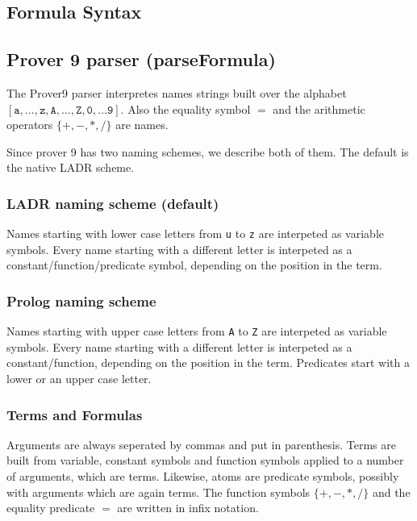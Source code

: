\documentclass[a4paper,11pt]{article}
\begin{document}
\begin{appendix}

\section{Formula Syntax}
\label{app:formulasyntax}
\subsection{Prover 9 parser (parseFormula)}

The Prover9 parser interpretes names strings built over the alphabet
 $[\mathtt{a, \ldots, z, A ,\ldots, Z, 0, \ldots 9} ]$. Also the
 equality symbol $=$ and the arithmetic operators $\{\mathtt{+,-,*,/}\}$
 are names.

Since prover 9 has two naming schemes, we describe both of them. The default
 is the native LADR scheme.

\subsubsection{LADR naming scheme (default)}

Names starting with lower case letters from \texttt{u} to \texttt{z} are
 interpeted as variable symbols. Every name starting with a different letter
 is interpeted as a constant/function/predicate symbol, depending on the
 position in the term.

\subsubsection{Prolog naming scheme}
Names starting with upper case letters from \texttt{A} to \texttt{Z} are
 interpeted as variable symbols. Every name starting with a different letter
 is interpeted as a constant/function, depending on the
 position in the term. Predicates start with a lower or an upper case letter.

\subsubsection{Terms and Formulas}
Arguments are always seperated by commas and put in parenthesis. Terms are
 built from variable, constant symbols and function symbols applied
 to a number of arguments, which are terms. Likewise, atoms are
 predicate symbols, possibly with arguments which are again terms. The
 function symbols $\{\mathtt{+,-,*,/}\}$ and the equality predicate $=$
 are written in infix notation.


\end{appendix}
\end{document}

